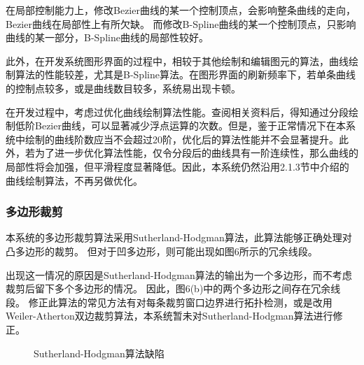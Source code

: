 \documentclass[a4paper,UTF8]{article}
\begin{document}
在局部控制能力上，修改Bezier曲线的某一个控制顶点，会影响整条曲线的走向，Bezier曲线在局部性上有所欠缺。
而修改B-Spline曲线的某一个控制顶点，只影响曲线的某一部分，B-Spline曲线的局部性较好。

此外，在开发系统图形界面的过程中，相较于其他绘制和编辑图元的算法，曲线绘制算法的性能较差，尤其是B-Spline算法。在图形界面的刷新频率下，若单条曲线的控制点较多，或是曲线数目较多，系统易出现卡顿。

在开发过程中，考虑过优化曲线绘制算法性能。查阅相关资料后，得知通过分段绘制低阶Bezier曲线，可以显著减少浮点运算的次数。但是，鉴于正常情况下在本系统中绘制的曲线阶数应当不会超过20阶，优化后的算法性能并不会显著提升。此外，若为了进一步优化算法性能，仅令分段后的曲线具有一阶连续性，那么曲线的局部性将会加强，但平滑程度显著降低。因此，本系统仍然沿用2.1.3节中介绍的曲线绘制算法，不再另做优化。


\subsubsection{多边形裁剪}
本系统的多边形裁剪算法采用Sutherland-Hodgman算法，此算法能够正确处理对凸多边形的裁剪。
但对于凹多边形，则可能出现如图6所示的冗余线段。

出现这一情况的原因是Sutherland-Hodgman算法的输出为一个多边形，而不考虑裁剪后留下多个多边形的情况。
因此，图6(b)中的两个多边形之间存在冗余线段。
修正此算法的常见方法有对每条裁剪窗口边界进行拓扑检测，或是改用Weiler-Atherton双边裁剪算法，本系统暂未对Sutherland-Hodgman算法进行修正。

\begin{figure}[H]
	\centering
	\caption{Sutherland-Hodgman算法缺陷}
\end{figure}
\end{document}
